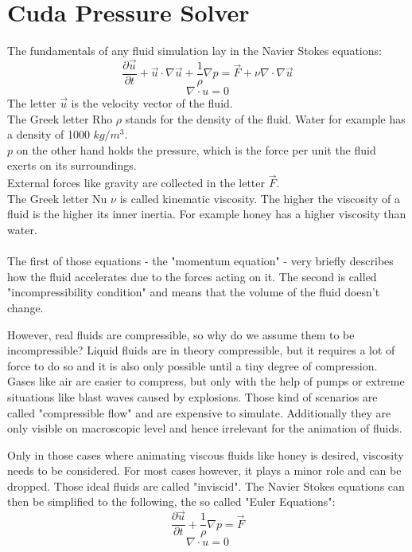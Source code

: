 \chapter{Cuda Pressure Solver}\label{chapter:cudapressuresolver}

The fundamentals of any fluid simulation lay in the Navier Stokes equations:\\
\begin{equation} \label{navier-stokes1}
\frac{\partial \vec{u}}{\partial t} + \vec{u} \cdot \nabla \vec{u} + \frac{1}{\rho}  \nabla p = \vec{F} + \nu \nabla \cdot \nabla \vec{u}
\end{equation}
\begin{equation} \label{navier-stokes2}
\nabla \cdot u = 0
\end{equation}
The letter $\vec{u}$ is the velocity vector of the fluid.\\
The Greek letter Rho $\rho$ stands for the density of the fluid. Water for example has a density of 1000 $kg/m^3$. \\
$p$ on the other hand holds the pressure, which is the force per unit the fluid exerts on its surroundings.\\
External forces like gravity are collected in the letter $\vec{F}$.\\
The Greek letter Nu $\nu$ is called kinematic viscosity. The higher the viscosity of a fluid is the higher its inner inertia. For example honey has a higher viscosity than water.\\\\
The first of those equations - the "momentum equation" - very briefly describes how the fluid accelerates due to the forces acting on it. The second is called "incompressibility condition" and means that the volume of the fluid doesn't change.
\par However, real fluids are compressible, so why do we assume them to be incompressible? Liquid fluids are in theory compressible, but it requires a lot of force to do so and it is also only possible until a tiny degree of compression. Gases like air are easier to compress, but only with the help of pumps or extreme situations like blast waves caused by explosions. Those kind of scenarios are called "compressible flow" and are expensive to simulate. Additionally they are only visible on macroscopic level and hence irrelevant for the animation of fluids.
\par Only in those cases where animating viscous fluids like honey is desired, viscosity needs to be considered. For most cases however, it plays a minor role and can be dropped. Those ideal fluids are called "inviscid". The Navier Stokes equations can then be simplified to the following, the so called "Euler Equations":
\begin{equation} \label{navier-stokes12}
\frac{\partial \vec{u}}{\partial t} + \frac{1}{\rho}  \nabla p = \vec{F}
\end{equation}
\begin{equation} \label{navier-stokes22}
\nabla \cdot u = 0
\end{equation}
